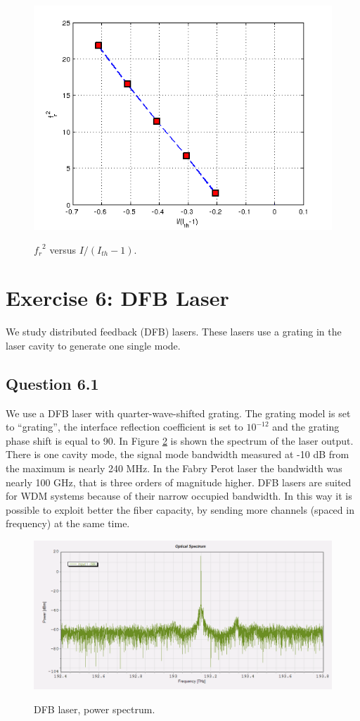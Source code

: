 \documentclass[a4paper,10pt]{report}
\begin{document}
\begin{figure}[!ht]
  \centering
  \includegraphics[width=12cm]{5_fr2.png}\\
  \caption{${f_r}^2$ versus $I/(I_{th}-1)$.}
  \label{5_fr2}
\end{figure}


\newpage
\section*{Exercise 6: DFB Laser}
We study distributed feedback (DFB) lasers. These lasers use a grating in the laser cavity to generate one single mode.

\subsection*{Question 6.1}
We use a DFB laser with quarter-wave-shifted grating. The grating model is set to ``grating'', the interface reflection coefficient is
set to $10^{-12}$ and the grating phase shift is equal to 90.
In Figure \ref{6_1} is shown the spectrum of the laser output. There is one cavity mode, the signal mode bandwidth measured at -10 dB from the
maximum is nearly 240 MHz. In the Fabry Perot laser the bandwidth was nearly 100 GHz, that is three orders of magnitude higher.
DFB lasers are suited for WDM systems because of their narrow occupied bandwidth. In this way it is possible to exploit better the fiber capacity,
by sending more channels (spaced in frequency) at the same time.

\begin{figure}[!ht]
  \centering
  \includegraphics[width=12cm]{6_1.png}\\
  \caption{DFB laser, power spectrum.}
  \label{6_1}
\end{figure}
\end{document}
